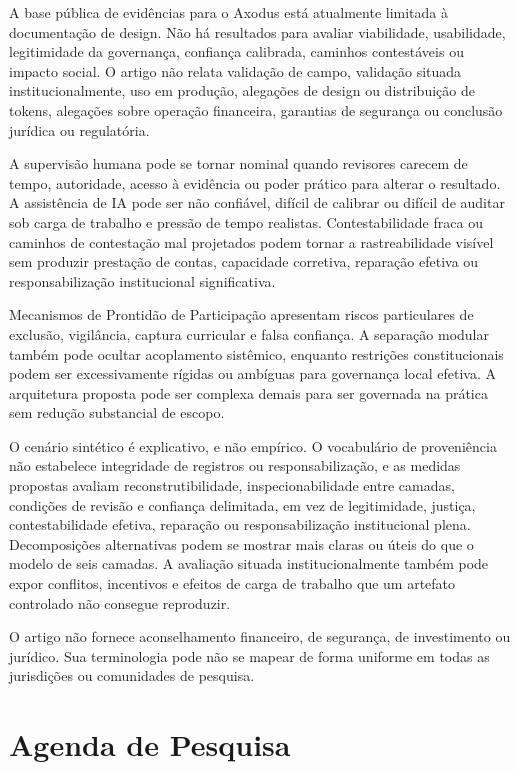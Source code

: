 \documentclass[11pt]{article}
\begin{document}
A base pública de evidências para o Axodus está atualmente limitada à
documentação de design. Não há resultados para avaliar viabilidade,
usabilidade, legitimidade da governança, confiança calibrada, caminhos
contestáveis ou impacto social. O artigo não relata validação de campo,
validação situada institucionalmente, uso em produção, alegações de design ou
distribuição de tokens, alegações sobre operação financeira, garantias de
segurança ou conclusão jurídica ou regulatória.

A supervisão humana pode se tornar nominal quando revisores carecem de tempo,
autoridade, acesso à evidência ou poder prático para alterar o resultado. A
assistência de IA pode ser não confiável, difícil de calibrar ou difícil de
auditar sob carga de trabalho e pressão de tempo realistas. Contestabilidade
fraca ou caminhos de contestação mal projetados podem tornar a rastreabilidade
visível sem produzir prestação de contas, capacidade corretiva, reparação
efetiva ou responsabilização institucional significativa.

Mecanismos de Prontidão de Participação apresentam riscos particulares de
exclusão, vigilância, captura curricular e falsa confiança. A separação
modular também pode ocultar acoplamento sistêmico, enquanto restrições
constitucionais podem ser excessivamente rígidas ou ambíguas para governança
local efetiva. A arquitetura proposta pode ser complexa demais para ser
governada na prática sem redução substancial de escopo.

O cenário sintético é explicativo, e não empírico. O vocabulário de
proveniência não estabelece integridade de registros ou responsabilização, e
as medidas propostas avaliam reconstrutibilidade, inspecionabilidade entre
camadas, condições de revisão e confiança delimitada, em vez de legitimidade,
justiça, contestabilidade efetiva, reparação ou responsabilização
institucional plena. Decomposições alternativas podem se mostrar mais claras
ou úteis do que o modelo de seis camadas. A avaliação situada
institucionalmente também pode expor conflitos, incentivos e efeitos de carga
de trabalho que um artefato controlado não consegue reproduzir.

O artigo não fornece aconselhamento financeiro, de segurança, de investimento
ou jurídico. Sua terminologia pode não se mapear de forma uniforme em todas as
jurisdições ou comunidades de pesquisa.

\section{Agenda de Pesquisa}
\end{document}
